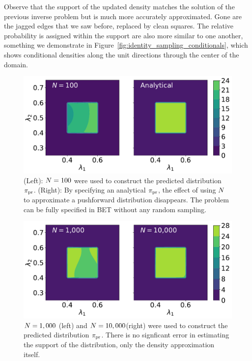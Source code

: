 Observe that the support of the updated density matches the solution of the previous inverse problem but is much more accurately approximated.
Gone are the jagged edges that we saw before, replaced by clean squares.
The relative probability is assigned within the support are also more similar to one another, something we demonstrate in Figure~\ref{fig:identity_sampling_conditionals}, which shows conditional densities along the unit directions through the center of the domain.

\begin{figure}[ht]
\begin{minipage}{.975\textwidth}
\includegraphics[width=\linewidth]{./examples/identity/samp/N100_N100-vs-Analytical_N100.pdf}
\end{minipage}
\caption{
(Left): $N=100$ were used to construct the predicted distribution $\operatorname*{\pi_{pr}}$.
(Right): By specifying an analytical $\operatorname*{\pi_{pr}}$, the effect of using $N$ to approximate a pushforward distribution disappears. The problem can be fully specified in BET without any random sampling.
}
\label{fig:ex:identity_sampling_exact}
\end{figure}

\begin{figure}[ht]
\begin{minipage}{.975\textwidth}
\includegraphics[width=\linewidth]{./examples/identity/samp/N1-000_N1000-vs-N10-000_N10000.pdf}
\end{minipage}
\caption{
$N=1,000$ (left) and $N=10,000$(right) were used to construct the predicted distribution $\operatorname*{\pi_{pr}}$.
There is no signficant error in estimating the support of the distribution, only the density approximation itself.
}
\label{fig:ex:identity_sampling_approx}
\end{figure}

